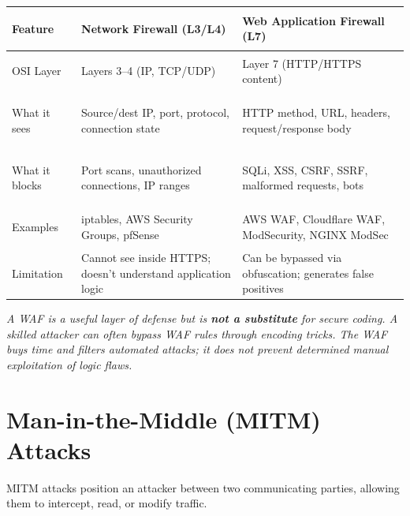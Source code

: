 \documentclass[11pt, letterpaper]{article}
\begin{document}
\noindent
{\renewcommand{\arraystretch}{1.6}
\begin{tabularx}{\textwidth}{>{\bfseries\raggedright\arraybackslash}p{3.5cm}
                              >{\raggedright\arraybackslash}X
                              >{\raggedright\arraybackslash}X}
\toprule
\rowcolor{tableheaderorange}
\textbf{Feature} & \textbf{Network Firewall (L3/L4)} & \textbf{Web Application Firewall (L7)} \\
\midrule
\rowcolor{rowOr} OSI Layer & Layers 3--4 (IP, TCP/UDP) & Layer 7 (HTTP/HTTPS content) \\
\rowcolor{rowA}  What it sees & Source/dest IP, port, protocol, connection state & HTTP method, URL, headers, request/response body \\
\rowcolor{rowOr} What it blocks & Port scans, unauthorized connections, IP ranges & SQLi, XSS, CSRF, SSRF, malformed requests, bots \\
\rowcolor{rowA}  Examples & iptables, AWS Security Groups, pfSense & AWS WAF, Cloudflare WAF, ModSecurity, NGINX ModSec \\
\rowcolor{rowOr} Limitation & Cannot see inside HTTPS; doesn't understand application logic & Can be bypassed via obfuscation; generates false positives \\
\bottomrule
\end{tabularx}}

\textit{A WAF is a useful layer of defense but is \textbf{not a substitute} for secure coding. A skilled attacker can often bypass WAF rules through encoding tricks. The WAF buys time and filters automated attacks; it does not prevent determined manual exploitation of logic flaws.}

\section*{Man-in-the-Middle (MITM) Attacks}

MITM attacks position an attacker between two communicating parties, allowing them to intercept, read, or modify traffic.
\end{document}
